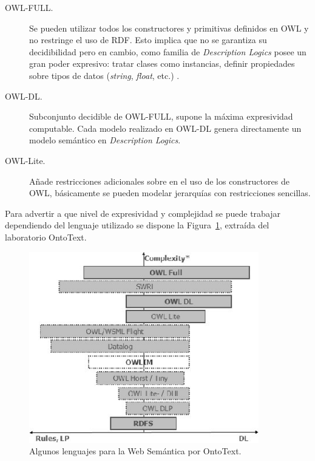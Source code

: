 \begin{description}
\item[OWL-FULL.] Se pueden utilizar todos los constructores y primitivas
definidos en OWL y no restringe el uso de RDF. Esto implica que no se garantiza
su decidibilidad pero en cambio, como familia de \textit{Description Logics}
posee un gran poder expresivo: tratar clases como instancias, definir
propiedades sobre tipos de datos (\textit{string}, \textit{float}, etc.) .

\item[OWL-DL.] Subconjunto decidible de OWL-FULL, supone la máxima expresividad
computable. Cada modelo realizado en OWL-DL genera directamente un modelo
semántico en \textit{Description Logics}.

\item[OWL-Lite.] Añade restricciones adicionales sobre en el uso de los
constructores de OWL, básicamente se pueden modelar jerarquías con restricciones
sencillas.
\end{description}

Para advertir a que nivel de expresividad y complejidad se puede trabajar
dependiendo del lenguaje utilizado se dispone la Figura~\ref{fig:owl-dialects}, extraída del laboratorio OntoText.

\begin{figure}[htb]
\centering
	\includegraphics[width=10cm]{images/owl-dialects}
\caption{Algunos lenguajes para la Web Semántica por OntoText.}
\label{fig:owl-dialects}
\end{figure}


